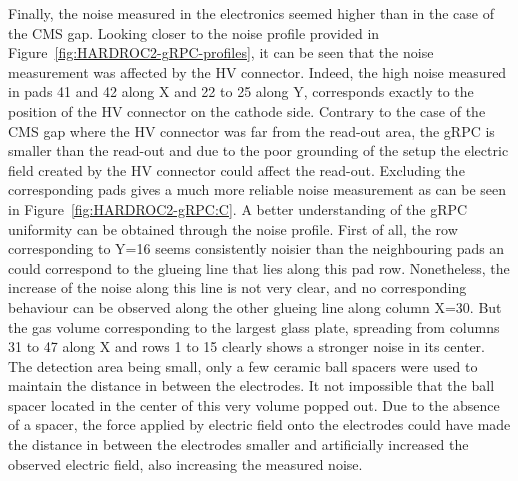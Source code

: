 	Finally, the noise measured in the electronics seemed higher than in the case of the CMS gap. Looking closer to the noise profile provided in Figure~\ref{fig:HARDROC2-gRPC-profiles}, it can be seen that the noise measurement was affected by the HV connector. Indeed, the high noise measured in pads 41 and 42 along X and 22 to 25 along Y, corresponds exactly to the position of the HV connector on the cathode side. Contrary to the case of the CMS gap where the HV connector was far from the read-out area, the gRPC is smaller than the read-out and due to the poor grounding of the setup the electric field created by the HV connector could affect the read-out. Excluding the corresponding pads gives a much more reliable noise measurement as can be seen in Figure~\ref{fig:HARDROC2-gRPC:C}. A better understanding of the gRPC uniformity can be obtained through the noise profile. First of all, the row corresponding to Y=16 seems consistently noisier than the neighbouring pads an could correspond to the glueing line that lies along this pad row. Nonetheless, the increase of the noise along this line is not very clear, and no corresponding behaviour can be observed along the other glueing line along column X=30. But the gas volume corresponding to the largest glass plate, spreading from columns 31 to 47 along X and rows 1 to 15 clearly shows a stronger noise in its center. The detection area being small, only a few ceramic ball spacers were used to maintain the distance in between the electrodes. It not impossible that the ball spacer located in the center of this very volume popped out. Due to the absence of a spacer, the force applied by electric field onto the electrodes could have made the distance in between the electrodes smaller and artificially increased the observed electric field, also increasing the measured noise.
	 
